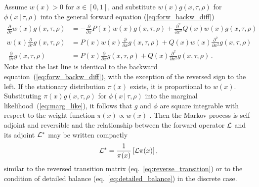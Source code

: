 \documentclass[preprint]{elsarticle}
\newcommand\given{{\,|\,}}
\begin{document}
Assume $w(x)>0$ for $x\in[0,1]$, and substitute $w(x)g(x,\tau,\rho)$ for $\phi(x\given\tau,\rho)$ into the general forward equation (\ref{eq:forw_backw_diff}) 
\begin{equation}
\begin{split}
\frac{\partial}{\partial \tau} w(x)g(x,\tau,\rho)&=-\frac{\partial}{\partial x}P(x)w(x)g(x,\tau,\rho)+\frac{\partial^2}{\partial x^2}Q(x)w(x) g(x,\tau,\rho)\\
w(x)\frac{\partial}{\partial \tau}g(x,\tau,\rho)&=P(x)w(x)\frac{\partial}{\partial x}g(x,\tau,\rho) +Q(x)w(x)\frac{\partial^2}{\partial x^2}g(x,\tau,\rho)\\\
\frac{\partial}{\partial \tau}g(x,\tau,\rho)&=P(x)\frac{\partial}{\partial x}g(x,\tau,\rho)+Q(x)\frac{\partial^2}{\partial x^2}g(x,\tau,\rho)\,.
\end{split}
\end{equation}
Note that the last line is identical to the backward equation~(\ref{eq:forw_backw_diff}), with the exception of the reversed sign to the left. If the stationary distribution $\pi(x)$ exists, it is proportional to $w(x)$. %
Substituting $\pi(x)g(x,\tau,\rho)$ for $\phi(x\given\tau,\rho)$ into the marginal likelihood~(\ref{eq:marg_like}), it follows that $g$ and $\phi$  are square integrable with respect to the weight function $\pi(x)\propto w(x)$ \citep{Song12}. Then the Markov process is self-adjoint and reversible and the relationship between the forward operator ${\cal L}$ and its adjoint ${\cal L}^{*}$ may be written compactly
\begin{equation}\label{compact}
{\cal L}^{*}=\frac1{\pi(x)}\left[{\cal L}\pi(x)\right],
\end{equation}
similar to the reversed transition matrix (eq.~\ref{eq:reverse_transition}) or to the condition of detailed balance (eq.~\ref{eq:detailed_balance}) in the discrete case.
\end{document}
